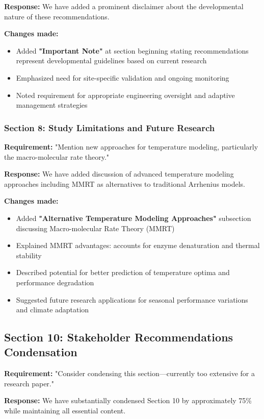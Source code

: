 \documentclass[12pt,a4paper]{article}
\begin{document}
\textbf{Response:} We have added a prominent disclaimer about the developmental nature of these recommendations.

\textbf{Changes made:}
\begin{itemize}
\item Added \textbf{"Important Note"} at section beginning stating recommendations represent developmental guidelines based on current research
\item Emphasized need for site-specific validation and ongoing monitoring
\item Noted requirement for appropriate engineering oversight and adaptive management strategies
\end{itemize}

\subsubsection{Section 8: Study Limitations and Future Research}
\textbf{Requirement:} "Mention new approaches for temperature modeling, particularly the macro-molecular rate theory."

\textbf{Response:} We have added discussion of advanced temperature modeling approaches including MMRT as alternatives to traditional Arrhenius models.

\textbf{Changes made:}
\begin{itemize}
\item Added \textbf{"Alternative Temperature Modeling Approaches"} subsection discussing Macro-molecular Rate Theory (MMRT)
\item Explained MMRT advantages: accounts for enzyme denaturation and thermal stability
\item Described potential for better prediction of temperature optima and performance degradation
\item Suggested future research applications for seasonal performance variations and climate adaptation
\end{itemize}

\subsection{Section 10: Stakeholder Recommendations Condensation}
\textbf{Requirement:} "Consider condensing this section—currently too extensive for a research paper."

\textbf{Response:} We have substantially condensed Section 10 by approximately 75\% while maintaining all essential content.
\end{document}

